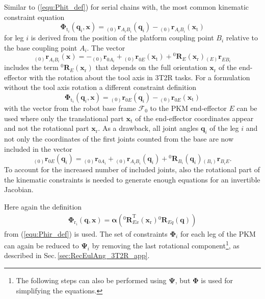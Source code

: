 \documentclass[twocolumn,10pt]{IFTOMM}
\newcommand{\bm}[1]{\boldsymbol{#1}}
\newcommand{\ortvek}[4]{{ }_{(#1)}{\boldsymbol{#2}}^{#3}_{#4} }
\newcommand{\rotmat}[2]{{{ }^{#1}\boldsymbol{R}}_{#2}}
\newcommand{\transp}[0]{{\mathrm{T}}}
\newcommand{\ks}[1]{{\mathcal{F}}_{#1}}
\begin{document}
Similar to (\ref{equ:Phit_def}) for serial chains with, the most common kinematic constraint equation 
%
\begin{equation}
\bm{\Phi}_{\mathrm{t}_i}(\bm{q}_i,\bm{x}) = \ortvek{0}{r}{}{A_iB_i}(\bm{q}_i) - \ortvek{0}{r}{}{A_iB_i}(\bm{x}_{\mathrm{t}})
\end{equation}
%
for leg $i$ is derived from the position of the platform coupling point $B_i$ relative to the base coupling point $A_i$. The vector
\begin{equation}
\ortvek{0}{r}{}{A_iB_i}(\bm{x}) = 
- \ortvek{0}{r}{}{0A_i}
+ \ortvek{0}{r}{}{0E}(\bm{x}_{\mathrm{t}}) + \rotmat{0}{E}(\bm{x}_{\mathrm{r}}) \ortvek{E}{r}{}{EB_i}
\end{equation}
%
includes the term $\rotmat{0}{E}(\bm{x}_{\mathrm{r}})$ that depends on the full orientation $\bm{x}_{\mathrm{r}}$ of the end-effector with the rotation about the tool axis in 3T2R tasks.
For a formulation without the tool axis rotation a different constraint definition
%
\begin{equation}
\bm{\Phi}_{\mathrm{t}_i}(\bm{q}_i,\bm{x}) = 
\ortvek{0}{r}{}{0E}(\bm{q}_i) - \ortvek{0}{r}{}{0E}(\bm{x}_{\mathrm{t}})
\end{equation}
%
with the vector from the robot base frame $\ks{0}$ to the PKM end-effector $E$ can be used where 
only the translational part $\bm{x}_{\mathrm{t}}$ of the end-effector coordinates appear and not the rotational part $\bm{x}_{\mathrm{r}}$.
As a drawback, all joint angles $\bm{q}_i$ of the leg $i$ and not only the coordinates of the first joints counted from the base are now included
in the vector
%
\begin{equation}
\ortvek{0}{r}{}{0E}(\bm{q}_i) = 
\ortvek{0}{r}{}{0A_i}
+ \ortvek{0}{r}{}{A_iB_i}(\bm{q}_i) + \rotmat{0}{B_i}(\bm{q}_i) \ortvek{B_i}{r}{}{B_iE}.
\end{equation}
%
To account for the increased number of included joints, also the rotational part of the kinematic constraints is needed to generate enough equations for an invertible Jacobian.

Here again the definition 
%
\begin{align}
\bm{\Phi}_{\mathrm{r}_i}(\bm{q},\bm{x})
=\bm{\alpha}\left(\rotmat{0}{Ex}^\transp (\bm{x}_{\mathrm{r}})\rotmat{0}{Eq}(\bm{q})\right)
\end{align}
%
from (\ref{equ:Phir_def}) is used.
The set of constraints $\bm{\Phi}_{i}$ for each leg of the PKM can again be reduced to $\bm{\Psi}_{i}$ by removing the last rotational component\footnote{The following steps can also be performed using $\bm{\Psi}$, but $\bm{\Phi}$ is used for simplifying the equations.}, as described in Sec.\,\ref{sec:RecEulAng_3T2R_app}.
\end{document}
